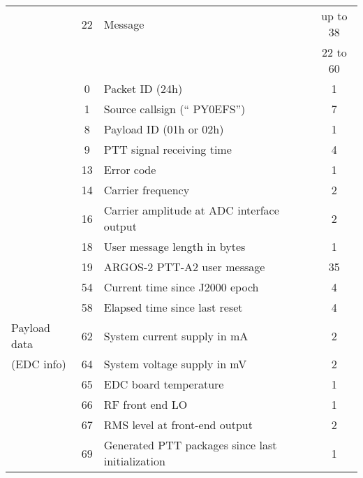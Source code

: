 \begin{longtable}[c]{lcL{0.4\textwidth}c}
                                            & 22 & Message                              & up to 38 \\
                                            &    &                                      & 22 to 60 \\
                                            & 0  & Packet ID (24h)                      & 1 \\
                                            & 1  & Source callsign (`` PY0EFS'')        & 7 \\
                                            & 8  & Payload ID (01h or 02h)              & 1 \\
                                            & 9  & PTT signal receiving time            & 4 \\
                                            & 13 & Error code                           & 1 \\
                                            & 14 & Carrier frequency                    & 2 \\
                                            & 16 & Carrier amplitude at ADC interface output & 2 \\
                                            & 18 & User message length in bytes         & 1 \\
                                            & 19 & ARGOS-2 PTT-A2 user message          & 35 \\
                                            & 54 & Current time since J2000 epoch       & 4 \\
                                            & 58 & Elapsed time since last reset        & 4 \\
   Payload data                             & 62 & System current supply in mA          & 2 \\
   (EDC info)                               & 64 & System voltage supply in mV          & 2 \\
                                            & 65 & EDC board temperature                & 1 \\
                                            & 66 & RF front end LO                      & 1 \\
                                            & 67 & RMS level at front-end output        & 2 \\
                                            & 69 & Generated PTT packages since last initialization & 1 \\

\end{longtable}
